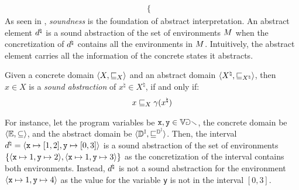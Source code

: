 \begin{description}
\begin{align*}
\begin{cases}
      \end{cases}
    \end{align*}
    As seen in , \emph{soundness} is the foundation of abstract interpretation. An abstract element $d^\natural$ is a sound abstraction of the set of environments $M$ when the concretization of $d^\natural$ contains all the environments in $M$. Intuitively, the abstract element carries all the information of the concrete states it abstracts.
    \begin{definition}
      Given a concrete domain $\langle X, \sqsubseteq_X \rangle$ and an abstract domain $\langle X^\natural, \sqsubseteq_{X^\natural} \rangle$, then $x\in X$ is a \emph{sound abstraction} of $x^\natural\in X^\natural$, if and only if:
    \begin{align*}
      x \sqsubseteq_X \gamma(x^\natural)
    \end{align*}
    \end{definition}
    For instance, let the program variables be $\textup{\texttt{x}}, \texttt{y} \in \mathbb{Var}$, the concrete domain be $\langle \mathbb{E}, \subseteq \rangle$, and the abstract domain be $\langle \mathbb{D}^{\mathbb{I}}, \sqsubseteq^{\mathbb{D}^{\mathbb{I}}} \rangle$.
    Then, the interval $d^\natural = \langle \textup{\texttt{x}} \mapsto [1, 2], \texttt{y} \mapsto [0, 3] \rangle$ is a sound abstraction of the set of environments $\{\langle \textup{\texttt{x}}\mapsto 1, \texttt{y}\mapsto 2 \rangle, \langle \textup{\texttt{x}}\mapsto 1, \texttt{y}\mapsto 3 \rangle\}$ as the concretization of the interval contains both environments. Instead, $d^\natural$ is not a sound abstraction for the environment $\langle \textup{\texttt{x}}\mapsto 1, \texttt{y}\mapsto 4 \rangle$ as the value for the variable \texttt{y} is not in the interval $[0, 3]$.


\end{description}
